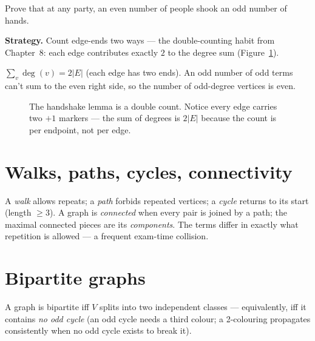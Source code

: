 \begin{example}\label{ex:handshake}
Prove that at any party, an even number of people shook an odd number
of hands.
\par\smallskip
\textbf{Strategy.} Count edge-ends two ways --- the double-counting
habit from Chapter~8: each edge contributes exactly $2$ to the degree
sum (Figure~\ref{fig:handshake}).
\par\smallskip
\begin{solution}
$\sum_v \deg(v) = 2|E|$ (each edge has two ends). An odd number of odd
terms can't sum to the even right side, so the number of odd-degree
vertices is even.
\end{solution}
\end{example}

\begin{figure}[ht]\centering

\caption{The handshake lemma is a double count. Notice every edge
carries two $+1$ markers --- the sum of degrees is $2|E|$ because the
count is per endpoint, not per edge.}
\label{fig:handshake}
\end{figure}

\section{Walks, paths, cycles, connectivity}\label{sec:walks}
A \emph{walk} allows repeats; a \emph{path} forbids repeated vertices; a
\emph{cycle} returns to its start (length $\ge 3$). A graph is
\emph{connected} when every pair is joined by a path; the maximal
connected pieces are its \emph{components}. The terms differ in exactly
what repetition is allowed --- a frequent exam-time collision.

\section{Bipartite graphs}\label{sec:bip}
A graph is bipartite iff $V$ splits into two independent classes ---
equivalently, iff it contains \emph{no odd cycle} (an odd cycle needs a
third colour; a 2-colouring propagates consistently when no odd cycle
exists to break it).

